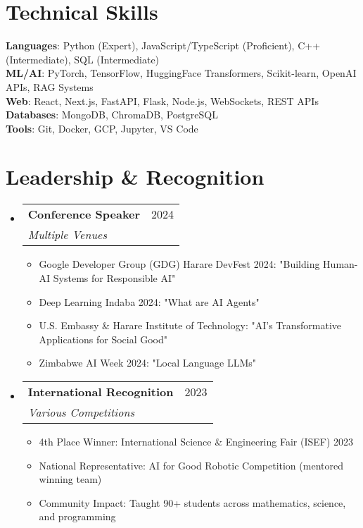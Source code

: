 \documentclass[letterpaper,11pt]{article}
\makeatletter
\newcommand{\resumeItem}[1]{
  \item\small{
    {#1 \vspace{-2pt}}
  }
}
\newcommand{\resumeSubheading}[4]{
  \vspace{-2pt}\item
    \begin{tabular*}{0.97\textwidth}[t]{l@{\extracolsep{\fill}}r}
      \textbf{#1} & #2 \\
      \textit{\small#3} & \textit{\small #4} \\
    \end{tabular*}\vspace{-7pt}
}
\newcommand{\resumeSubHeadingListStart}{\begin{itemize}[leftmargin=0.15in, label={}]}
\newcommand{\resumeSubHeadingListEnd}{\end{itemize}}
\newcommand{\resumeItemListStart}{\begin{itemize}}
\newcommand{\resumeItemListEnd}{\end{itemize}\vspace{-5pt}}
\makeatother
\begin{document}
\section{Technical Skills}
 \begin{itemize}[leftmargin=0.15in, label={}]
    \small{\item{
     \textbf{Languages}{: Python (Expert), JavaScript/TypeScript (Proficient), C++ (Intermediate), SQL (Intermediate)} \\
     \textbf{ML/AI}{: PyTorch, TensorFlow, HuggingFace Transformers, Scikit-learn, OpenAI APIs, RAG Systems} \\
     \textbf{Web}{: React, Next.js, FastAPI, Flask, Node.js, WebSockets, REST APIs} \\
     \textbf{Databases}{: MongoDB, ChromaDB, PostgreSQL} \\
     \textbf{Tools}{: Git, Docker, GCP, Jupyter, VS Code}
    }}
 \end{itemize}


\section{Leadership \& Recognition}
  \resumeSubHeadingListStart
    \resumeSubheading
      {Conference Speaker}{2024}
      {Multiple Venues}{}
      \resumeItemListStart
        \resumeItem{Google Developer Group (GDG) Harare DevFest 2024: "Building Human-AI Systems for Responsible AI"}
        \resumeItem{Deep Learning Indaba 2024: "What are AI Agents"}
        \resumeItem{U.S. Embassy \& Harare Institute of Technology: "AI's Transformative Applications for Social Good"}
        \resumeItem{Zimbabwe AI Week 2024: "Local Language LLMs"}
      \resumeItemListEnd
    \resumeSubheading
      {International Recognition}{2023}
      {Various Competitions}{}
      \resumeItemListStart
        \resumeItem{4th Place Winner: International Science \& Engineering Fair (ISEF) 2023}
        \resumeItem{National Representative: AI for Good Robotic Competition (mentored winning team)}
        \resumeItem{Community Impact: Taught 90+ students across mathematics, science, and programming}
      \resumeItemListEnd
  \resumeSubHeadingListEnd


\end{document}
